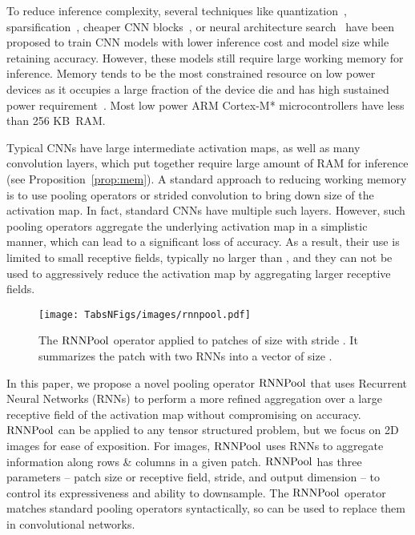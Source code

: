 \documentclass[10pt]{article}
\newcommand{\rpool}{\ensuremath{{\rm RNNPool}}\xspace}
\begin{document}
To reduce inference complexity, several techniques like
quantization~\citep{wang2019haq},
sparsification~\citep{gale2019state,kusupati2020soft}, cheaper CNN
blocks~\citep{sandler2018mobilenetv2,iandola2016squeezenet}, or neural
architecture search~\citep{tan2019efficientnet} have been proposed to
train CNN models with lower inference cost and model size while
retaining accuracy. However, these models still require large working
memory for inference. Memory tends to be the most constrained resource
on low power devices as it occupies a large fraction of the device die and
has high sustained power requirement~\citep{kim2017evaluating}. Most
low power ARM Cortex-M* microcontrollers have less than 256 KB~RAM.

Typical CNNs have large intermediate activation maps, as well as many
convolution layers, which put together require large amount of RAM for
inference (see Proposition~\ref{prop:mem}).  A standard approach to
reducing working memory is to use pooling operators or strided
convolution to bring down size of the activation map. In fact,
standard CNNs have multiple such layers. However, such pooling
operators aggregate the underlying activation map in a simplistic
manner, which can lead to a significant loss of accuracy. As a result,
their use is limited to small receptive fields, typically no larger
than , and they can not be used to aggressively reduce the
activation map by aggregating larger receptive fields.

\begin{wrapfigure}{r}{0.5\columnwidth}
\vspace{-9pt}
 \centering
 \texttt{[image: TabsNFigs/images/rnnpool.pdf]}
 \vspace{-13pt}
 \caption{The \rpool operator applied to patches of size 
   with stride . It summarizes the patch with two RNNs into a
   vector of size .}
\label{fig:rnnpoolillus}	
\vspace{-10pt}
\end{wrapfigure}
  In this paper, we propose a
novel pooling operator \rpool that uses Recurrent Neural Networks
(RNNs) to perform a more refined aggregation over a large receptive field of
the activation map without compromising on accuracy. \rpool can be applied
to any tensor structured problem, but we focus on 2D images for ease
of exposition. For images, \rpool uses RNNs to aggregate information
along rows \& columns in a given patch. \rpool has three parameters --
patch size or receptive field, stride, and output dimension -- to
control its expressiveness and ability to downsample. The \rpool
operator matches standard pooling operators syntactically, so can be used to replace
them in convolutional networks.
\end{document}
